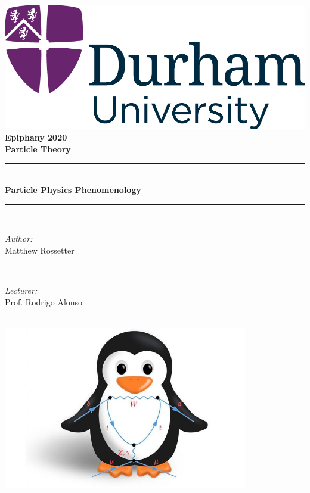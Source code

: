 \documentclass[a4paper, 11pt, normalem]{report}
\begin{document}
\begin{titlepage}
    \newcommand{\HRule}{\rule{\linewidth}{0.5mm}}
    \center
    {\includegraphics[scale=0.5]{../../logo0.png}\hfill{\Large\bfseries Epiphany 2020}}\\[2.5cm]
    {\LARGE\bfseries Particle Theory}\\[1.5cm]
    \HRule \\[0.7cm]
    {\huge\bfseries Particle Physics Phenomenology}\\[0.4cm]
    \HRule \\[1.5cm]

    \begin{minipage}{0.4\textwidth}
        \begin{flushleft} \large
            \emph{Author:} \\ Matthew Rossetter
        \end{flushleft}
    \end{minipage}~
    \begin{minipage}{0.4\textwidth}
        \begin{flushright} \large
            \emph{Lecturer:} \\ Prof. Rodrigo Alonso
        \end{flushright}
    \end{minipage}\\[2cm]
    \vfill
    \includegraphics[width=0.8\textwidth]{penguin2.jpg}\\[1cm]
    \vfill
\end{titlepage}
\tableofcontents
\end{document}
